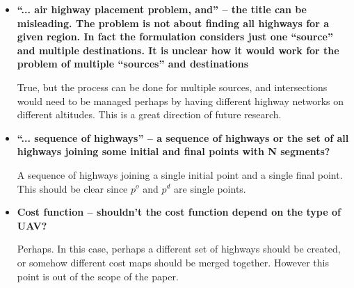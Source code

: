 \documentclass[submit]{aiaa-pretty}
\begin{document}
\begin{itemize}
\item \textbf{ ``... air highway placement problem, and'' – the title can be misleading. The problem is not about finding all highways for a given region. In fact the formulation considers just one “source” and multiple destinations. It is unclear how it would work for the problem of multiple ``sources'' and destinations}

True, but the process can be done for multiple sources, and intersections would need to be managed perhaps by having different highway networks on different altitudes. This is a great direction of future research.

\item \textbf{``... sequence of highways'' – a sequence of highways or the set of all highways joining some initial and final points with N segments?}

A sequence of highways joining a single initial point and a single final point. This should be clear since $p^o$ and $p^d$ are single points.

\item \textbf{Cost function – shouldn’t the cost function depend on the type of UAV?}

Perhaps. In this case, perhaps a different set of highways should be created, or somehow different cost maps should be merged together. However this point is out of the scope of the paper.

\end{itemize}
\end{document}
